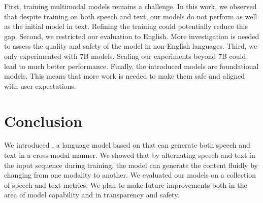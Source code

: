 First, training multimodal models remains a challenge. In this work, we observed that despite training on both speech and text, our \spot models do not perform as well as the initial \llamatwo model in text. Refining the training could potentially reduce this gap. Second, we restricted our evaluation to English. %
More investigation is needed to assess the quality and safety of the model in non-English languages. 
Third, we only experimented with 7B models. Scaling our experiments beyond 7B could lead to much better performance. 
Finally, the introduced \spot models are foundational models. This means that more work is needed to make them safe and aligned with user expectations. %

\section{Conclusion}\label{sec:conclusion}
 We introduced \spot{}, a language model based on \llamatwo that can generate both speech and text in a cross-modal manner. We showed that by alternating speech and text in the input sequence during training, the model can  generate the content fluidly by changing from one modality to another. We evaluated our models on a collection of speech and text metrics. We plan to make future improvements both in the area of model capability and in transparency and safety.

